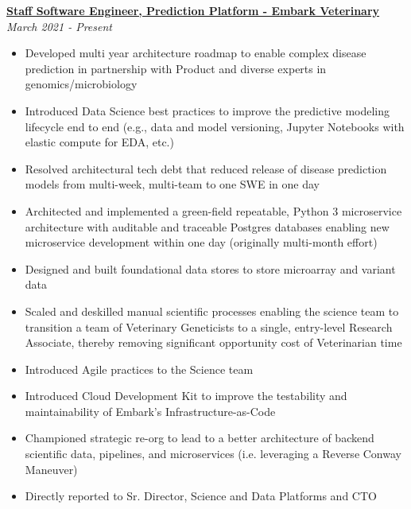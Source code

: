 \documentclass[line]{res}
\begin{document}
\begin{resume}
{\bf \underline{Staff Software Engineer, Prediction Platform - Embark Veterinary }} \hfill {\sl March 2021 - Present}\\[2pt]
 \begin{itemize} \itemsep -1pt %
	\item Developed multi year architecture roadmap to enable complex disease prediction in partnership with Product and diverse experts in genomics/microbiology
	\item Introduced Data Science best practices to improve the predictive modeling lifecycle end to end (e.g., data and model versioning, Jupyter Notebooks with elastic compute for EDA, etc.)
	\item Resolved architectural tech debt that reduced release of disease prediction models from multi-week, multi-team to one SWE in one day
	\item Architected and implemented a green-field repeatable, Python 3 microservice architecture with auditable and traceable Postgres databases enabling new microservice development within one day (originally multi-month effort)
	\item Designed and built foundational data stores to store microarray and variant data
	\item Scaled and deskilled manual scientific processes enabling the science team to transition a team of Veterinary Geneticists to a single, entry-level Research Associate, thereby removing significant opportunity cost of Veterinarian time
	\item Introduced Agile practices to the Science team
	\item Introduced Cloud Development Kit to improve the testability and maintainability of Embark's Infrastructure-as-Code
	\item Championed strategic re-org to lead to a better architecture of backend scientific data, pipelines, and microservices (i.e. leveraging a Reverse Conway Maneuver)
	\item Directly reported to Sr. Director, Science and Data Platforms and CTO
 \end{itemize}


\end{resume}
\end{document}
